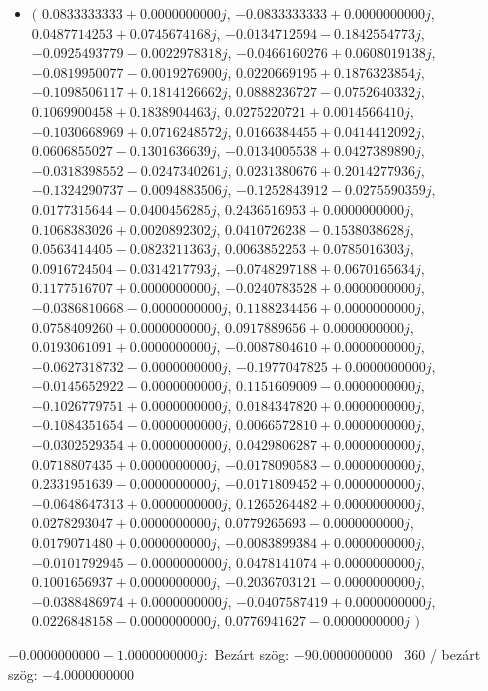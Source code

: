 \documentclass[14pt,a4paper]{article}
\begin{document}
\begin{itemize}
\item
$\big($
$0.0833333333+0.0000000000j$, $-0.0833333333+0.0000000000j$, $0.0487714253+0.0745674168j$, $-0.0134712594-0.1842554773j$, $-0.0925493779-0.0022978318j$, $-0.0466160276+0.0608019138j$, $-0.0819950077-0.0019276900j$, $0.0220669195+0.1876323854j$, $-0.1098506117+0.1814126662j$, $0.0888236727-0.0752640332j$, $0.1069900458+0.1838904463j$, $0.0275220721+0.0014566410j$, $-0.1030668969+0.0716248572j$, $0.0166384455+0.0414412092j$, $0.0606855027-0.1301636639j$, $-0.0134005538+0.0427389890j$, $-0.0318398552-0.0247340261j$, $0.0231380676+0.2014277936j$, $-0.1324290737-0.0094883506j$, $-0.1252843912-0.0275590359j$, $0.0177315644-0.0400456285j$, $0.2436516953+0.0000000000j$, $0.1068383026+0.0020892302j$, $0.0410726238-0.1538038628j$, $0.0563414405-0.0823211363j$, $0.0063852253+0.0785016303j$, $0.0916724504-0.0314217793j$, $-0.0748297188+0.0670165634j$, $0.1177516707+0.0000000000j$, $-0.0240783528+0.0000000000j$, $-0.0386810668-0.0000000000j$, $0.1188234456+0.0000000000j$, $0.0758409260+0.0000000000j$, $0.0917889656+0.0000000000j$, $0.0193061091+0.0000000000j$, $-0.0087804610+0.0000000000j$, $-0.0627318732-0.0000000000j$, $-0.1977047825+0.0000000000j$, $-0.0145652922-0.0000000000j$, $0.1151609009-0.0000000000j$, $-0.1026779751+0.0000000000j$, $0.0184347820+0.0000000000j$, $-0.1084351654-0.0000000000j$, $0.0066572810+0.0000000000j$, $-0.0302529354+0.0000000000j$, $0.0429806287+0.0000000000j$, $0.0718807435+0.0000000000j$, $-0.0178090583-0.0000000000j$, $0.2331951639-0.0000000000j$, $-0.0171809452+0.0000000000j$, $-0.0648647313+0.0000000000j$, $0.1265264482+0.0000000000j$, $0.0278293047+0.0000000000j$, $0.0779265693-0.0000000000j$, $0.0179071480+0.0000000000j$, $-0.0083899384+0.0000000000j$, $-0.0101792945-0.0000000000j$, $0.0478141074+0.0000000000j$, $0.1001656937+0.0000000000j$, $-0.2036703121-0.0000000000j$, $-0.0388486974+0.0000000000j$, $-0.0407587419+0.0000000000j$, $0.0226848158-0.0000000000j$, $0.0776941627-0.0000000000j$
$\big)$
\end{itemize}
$-0.0000000000-1.0000000000j$:\
Bezárt szög: $-90.0000000000$ \
360 / bezárt szög: $-4.0000000000$\
\end{document}
